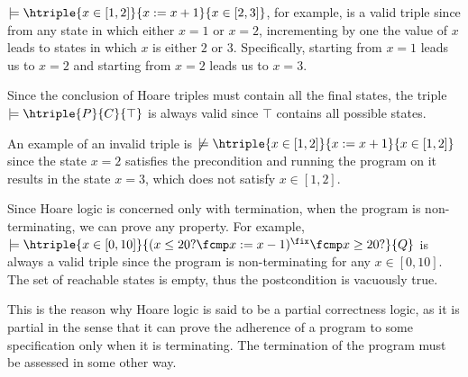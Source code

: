 \begin{example}
  \label{exmp:hlogic}
$\models \htriple{x \in [1, 2]}{x := x + 1}{x \in [2, 3]}$, for example, is a
valid triple since from any state in which either $x = 1$ or $x = 2$,
incrementing by one the value of $x$ leads to states in which $x$ is either $2$
or $3$. Specifically, starting from $x = 1$ leads us to $x = 2$ and starting
from $x = 2$ leads us to $x = 3$.

Since the conclusion of Hoare triples must contain all the final states, the
triple $\models \htriple{P}{C}{\top}$ is always valid since $\top$ contains all
possible states.

An example of an invalid triple is $\not \models \htriple{x \in [1, 2]}{x := x
+ 1}{x \in [1, 2]}$ since the state $x = 2$ satisfies the precondition and
running the program on it results in the state $x = 3$, which does not satisfy
$x \in [1, 2]$.

Since Hoare logic is concerned only with termination, when the program is
non-terminating, we can prove any property. For example, $\models \htriple{x
\in [0, 10]}{(x \leq 20? \fcmp x := x - 1)^\fix \fcmp x \geq 20?}{Q}$ is always
a valid triple since the program is non-terminating for any $x \in [0, 10]$. 
The set of reachable states is empty, thus the postcondition is vacuously true.

This is the reason why Hoare logic is said to be a partial correctness logic,
as it is partial in the sense that it can prove the adherence of a program to
some specification only when it is terminating. The termination of the program
must be assessed in some other way.
\end{example}

